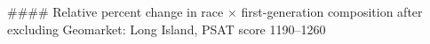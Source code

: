 #### Relative percent change in race × first-generation composition after excluding Geomarket: Long Island, PSAT score 1190–1260
